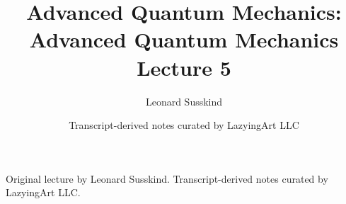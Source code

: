 \documentclass[11pt,oneside]{book}
\begin{document}
\frontmatter
\title{Advanced Quantum Mechanics: Advanced Quantum Mechanics Lecture 5}
\author{Leonard Susskind}
\date{Transcript-derived notes curated by LazyingArt LLC}
\maketitle
\begin{center}
\small Original lecture by Leonard Susskind. Transcript-derived notes curated by LazyingArt LLC.
\end{center}
\clearpage
\mainmatter

\end{document}
